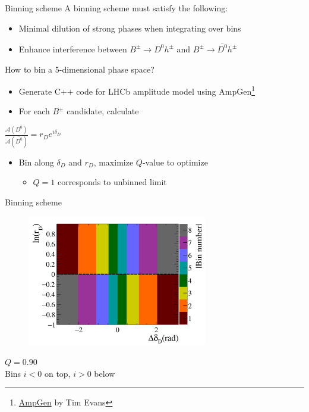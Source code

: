\documentclass{beamer}
\begin{document}
\begin{frame}{Binning scheme}
  \vspace{0.0cm}
  {\Large A binning scheme must satisfy the following:}
  \begin{itemize}
    \item{Minimal dilution of strong phases when integrating over bins}
    \item{Enhance interference between $B^\pm\to D^0h^\pm$ and $B^\pm\to\bar{D^0}h^\pm$}
  \end{itemize}
  \vspace{0.4cm}
  {\Large How to bin a 5-dimensional phase space?}
  \begin{itemize}
    \item{Generate C++ code for LHCb amplitude model using AmpGen\footnote{\href{https://github.com/GooFit/AmpGen}{AmpGen} by Tim Evans}}
    \item{For each $B^\pm$ candidate, calculate}
  \end{itemize}
  \begin{center}
    {\Large $\frac{\mathcal{A}(D^0)}{\mathcal{A}(\bar{D^0})} = r_De^{i\delta_D}$}
  \end{center}
  \begin{itemize}
    \item{Bin along $\delta_D$ and $r_D$, maximize $Q$-value to optimize}
    \begin{itemize}
      \item{$Q = 1$ corresponds to unbinned limit}
    \end{itemize}
  \end{itemize}
\end{frame}

\begin{frame}{Binning scheme}
  \begin{figure}
    \centering
    \includegraphics[width = 0.7\textwidth]{Plots/BinningSchemePlot_8Bins.png}
  \end{figure}
  \vspace{-1.0cm}
  \begin{center}
    $Q = 0.90$ \\
    Bins $i < 0$ on top, $i > 0$ below
  \end{center}
\end{frame}
\end{document}
